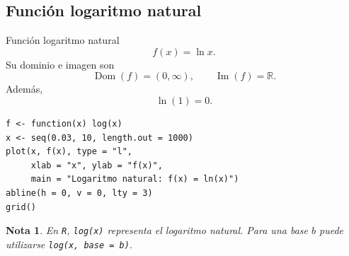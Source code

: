 \documentclass[aspectratio=169,10pt]{beamer}
\newtheorem{nota}{Nota}
\newcommand{\R}{\mathbb{R}}
\newcommand{\Dom}{\operatorname{Dom}}
\newcommand{\Ima}{\operatorname{Im}}
\begin{document}
\subsection*{Función logaritmo natural}
\begin{frame}{Función logaritmo natural}
\[
f(x)=\ln x.
\]
Su dominio e imagen son
\[
\Dom(f)=(0,\infty),
\qquad
\Ima(f)=\R.
\]
Además,
\[
\ln(1)=0.
\]

\begin{center}
\end{center}

\begin{verbatim}
f <- function(x) log(x)
x <- seq(0.03, 10, length.out = 1000)
plot(x, f(x), type = "l",
     xlab = "x", ylab = "f(x)",
     main = "Logaritmo natural: f(x) = ln(x)")
abline(h = 0, v = 0, lty = 3)
grid()
\end{verbatim}

\begin{nota}
En \texttt{R}, \texttt{log(x)} representa el logaritmo natural. Para una base
$b$ puede utilizarse \texttt{log(x, base = b)}.
\end{nota}

\end{frame}
\end{document}
